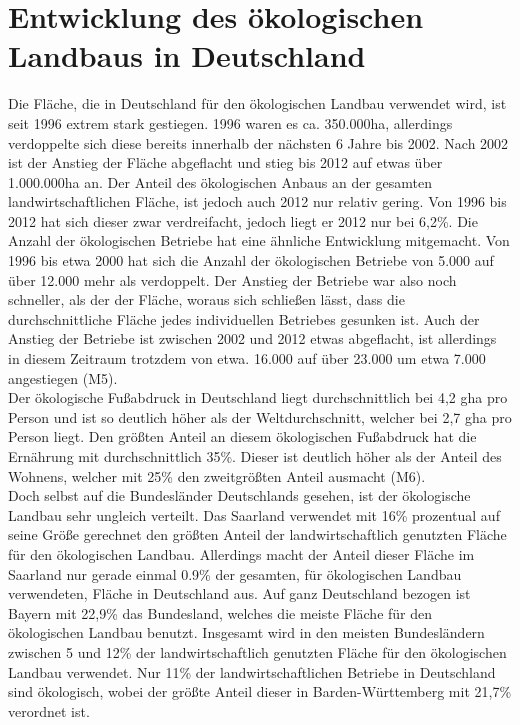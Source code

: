 \documentclass[12pt, a4paper]{report}
\begin{document}
	\bsremovechaptertitle
	\chapter*
{Entwicklung des ökologischen Landbaus in Deutschland}
	Die Fläche, die in Deutschland für den ökologischen Landbau verwendet wird, ist seit 1996 extrem stark gestiegen.
	1996 waren es ca. 350.000ha, allerdings verdoppelte sich diese bereits innerhalb der nächsten 6 Jahre bis 2002.
	Nach 2002 ist der Anstieg der Fläche abgeflacht und stieg bis 2012 auf etwas über 1.000.000ha an.
	Der Anteil des ökologischen Anbaus an der gesamten landwirtschaftlichen Fläche, ist jedoch auch 2012 nur relativ gering.
	Von 1996 bis 2012 hat sich dieser zwar verdreifacht, jedoch liegt er 2012 nur bei 6,2\%.
	Die Anzahl der ökologischen Betriebe hat eine ähnliche Entwicklung mitgemacht.
	Von 1996 bis etwa 2000 hat sich die Anzahl der ökologischen Betriebe von 5.000 auf über 12.000 mehr als verdoppelt.
	Der Anstieg der Betriebe war also noch schneller, als der der Fläche, woraus sich schließen lässt, dass die durchschnittliche Fläche jedes individuellen Betriebes gesunken ist.
	Auch der Anstieg der Betriebe ist zwischen 2002 und 2012 etwas abgeflacht, ist allerdings in diesem Zeitraum trotzdem von etwa. 16.000 auf über 23.000 um etwa 7.000 angestiegen (M5).
	\\
	Der ökologische Fußabdruck in Deutschland liegt durchschnittlich bei 4,2 gha pro Person und ist so deutlich höher als der Weltdurchschnitt, welcher bei 2,7 gha pro Person liegt.
	Den größten Anteil an diesem ökologischen Fußabdruck hat die Ernährung mit durchschnittlich 35\%.
	Dieser ist deutlich höher als der Anteil des Wohnens, welcher mit 25\% den zweitgrößten Anteil ausmacht (M6).
	\\
	Doch selbst auf die Bundesländer Deutschlands gesehen, ist der ökologische Landbau sehr ungleich verteilt.
	Das Saarland verwendet mit 16\% prozentual auf seine Größe gerechnet den größten Anteil der landwirtschaftlich genutzten Fläche für den ökologischen Landbau.
	Allerdings macht der Anteil dieser Fläche im Saarland nur gerade einmal 0.9\% der gesamten, für ökologischen Landbau verwendeten, Fläche in Deutschland aus.
	Auf ganz Deutschland bezogen ist Bayern mit 22,9\% das Bundesland, welches die meiste Fläche für den ökologischen Landbau benutzt.
	Insgesamt wird in den meisten Bundesländern zwischen 5 und 12\% der landwirtschaftlich genutzten Fläche für den ökologischen Landbau verwendet.
	Nur 11\% der landwirtschaftlichen Betriebe in Deutschland sind ökologisch, wobei der größte Anteil dieser in Barden-Württemberg mit 21,7\% verordnet ist.
\end{document}
